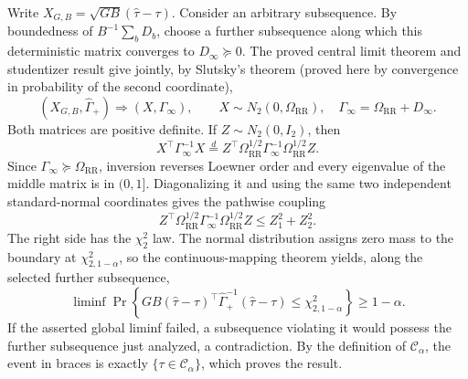 Write \(X_{G,B}=\sqrt{GB}(\widehat\tau-\tau)\).  Consider an arbitrary subsequence.  By boundedness of \(B^{-1}\sum_bD_b\), choose a further subsequence along which this deterministic matrix converges to \(D_\infty\succeq0\).  The proved central limit theorem and studentizer result give jointly, by Slutsky's theorem (proved here by convergence in probability of the second coordinate),
\[
 (X_{G,B},\widehat\Gamma_+)
 \Rightarrow (X,\Gamma_\infty),
 \qquad X\sim N_2(0,\Omega_{\mathrm{RR}}),
 \quad \Gamma_\infty=\Omega_{\mathrm{RR}}+D_\infty.
\]
Both matrices are positive definite.  If \(Z\sim N_2(0,I_2)\), then
\[
 X^\top\Gamma_\infty^{-1}X
 \stackrel d=Z^\top
 \Omega_{\mathrm{RR}}^{1/2}\Gamma_\infty^{-1}
 \Omega_{\mathrm{RR}}^{1/2}Z.
\]
Since \(\Gamma_\infty\succeq\Omega_{\mathrm{RR}}\), inversion reverses Loewner order and every eigenvalue of the middle matrix is in \((0,1]\).  Diagonalizing it and using the same two independent standard-normal coordinates gives the pathwise coupling
\[
 Z^\top\Omega_{\mathrm{RR}}^{1/2}\Gamma_\infty^{-1}
 \Omega_{\mathrm{RR}}^{1/2}Z
 \leq Z_1^2+Z_2^2.
\]
The right side has the \(\chi^2_2\) law.  The normal distribution assigns zero mass to the boundary at \(\chi^2_{2,1-\alpha}\), so the continuous-mapping theorem yields, along the selected further subsequence,
\[
 \liminf\Pr\!\left\{
 GB(\widehat\tau-\tau)^\top\widehat\Gamma_+^{-1}(\widehat\tau-\tau)
 \leq\chi^2_{2,1-\alpha}\right\}\geq1-\alpha.
\]
If the asserted global liminf failed, a subsequence violating it would possess the further subsequence just analyzed, a contradiction.  By the definition of \(\mathcal C_\alpha\), the event in braces is exactly \(\{\tau\in\mathcal C_\alpha\}\), which proves the result.
